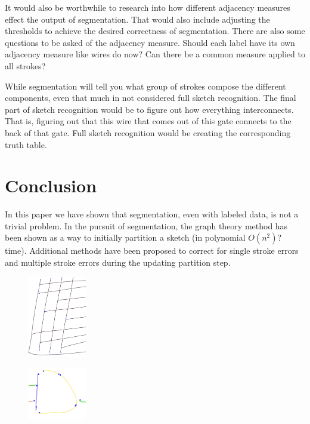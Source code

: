 \documentclass[10pt]{acmsiggraph}               %
\begin{document}
It would also be worthwhile to research into how different adjacency measures effect the output of segmentation.
That would also include adjusting the thresholds to achieve the desired correctness of segmentation.
There are also some questions to be asked of the adjacency measure.
Should each label have its own adjacency measure like wires do now?
Can there be a common measure applied to all strokes?

While segmentation will tell you what group of strokes compose the different components, even that much in not considered full sketch recognition.
The final part of sketch recognition would be to figure out how everything interconnects.  
That is, figuring out that this wire that comes out of this gate connects to the back of that gate.
Full sketch recognition would be creating the corresponding truth table.

\section{Conclusion}
In this paper we have shown that segmentation, even with labeled data, is not a trivial problem.
In the pursuit of segmentation, the graph theory method has been shown as a way to initially partition a sketch (in polynomial $O(n^2)$? time).
Additional methods have been proposed to correct for single stroke errors and multiple stroke errors during the updating partition step.

\begin{figure}[h]
\centering
\includegraphics[width=1.0in]{missegmentedwire1.png}
\label{fig:connections}
\end{figure}

\begin{figure}[h]
\centering
\includegraphics[width=1.0in]{missegmentedgate1.png}
\label{fig:connections}
\end{figure}
\end{document}
